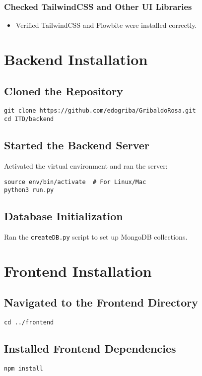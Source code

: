 \subsubsection*{Checked TailwindCSS and Other UI Libraries}
\begin{itemize}
    \item Verified TailwindCSS and Flowbite were installed correctly.
\end{itemize}

\section{Backend Installation}

\subsection{Cloned the Repository}
\begin{verbatim}
git clone https://github.com/edogriba/GribaldoRosa.git
cd ITD/backend
\end{verbatim}

\subsection{Started the Backend Server}
Activated the virtual environment and ran the server:
\begin{verbatim}
source env/bin/activate  # For Linux/Mac
python3 run.py
\end{verbatim}

\subsection{Database Initialization}
Ran the \texttt{createDB.py} script to set up MongoDB collections.

\section{Frontend Installation}

\subsection{Navigated to the Frontend Directory}
\begin{verbatim}
cd ../frontend
\end{verbatim}

\subsection{Installed Frontend Dependencies}
\begin{verbatim}
npm install
\end{verbatim}

